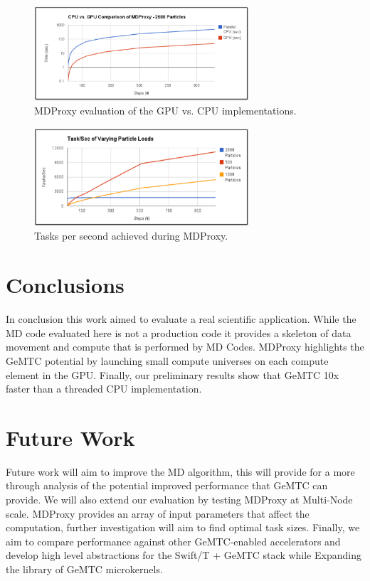 \documentclass[conference]{IEEEtran}
\begin{document}
\begin{figure}[h]
\centering\includegraphics[width=8cm]{imgs/cpu_gpu.png}
\caption{MDProxy evaluation of the GPU vs. CPU implementations.}
\label{fig:cpu_gpu}
\end{figure}

\begin{figure}[h]
\centering\includegraphics[width=8cm]{imgs/tasks_per_sec.png}
\caption{Tasks per second achieved during MDProxy.}
\label{fig:tasks_per_sec}
\end{figure}


\section{Conclusions}
In conclusion this work aimed to evaluate a real scientific application. While the MD code evaluated here is not a production code it provides a skeleton of data movement and compute that is performed by MD Codes. MDProxy highlights the GeMTC potential by launching small compute universes on each compute element in the GPU. Finally, our preliminary results show that GeMTC 10x faster than a threaded CPU implementation.

\section{Future Work}
Future work will aim to improve the MD algorithm, this will provide for a more through analysis of the potential improved performance that GeMTC can provide. We will also extend our evaluation by testing MDProxy at Multi-Node scale. MDProxy provides an array of input parameters that affect the computation, further investigation will aim to find optimal task sizes. Finally, we aim to compare performance against other GeMTC-enabled accelerators and develop high level abstractions for the Swift/T + GeMTC stack while Expanding the library of GeMTC microkernels.



\end{document}
